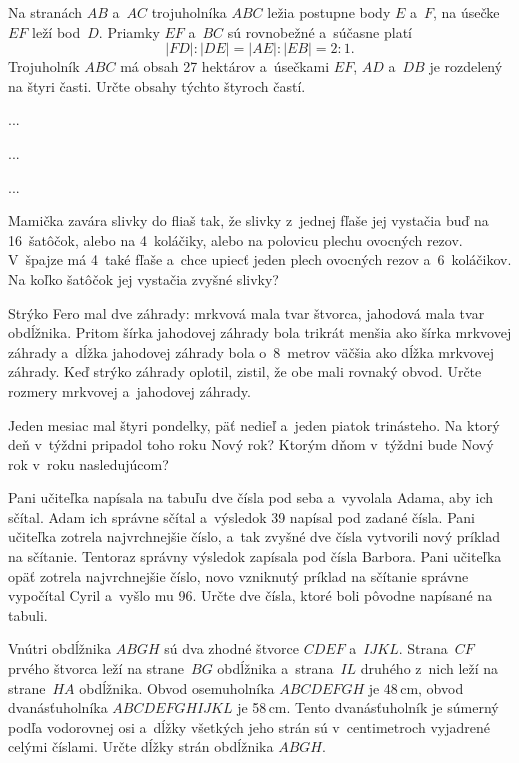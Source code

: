 {%
Na stranách $AB$ a~$AC$ trojuholníka $ABC$ ležia postupne body $E$ a~$F$,
na úsečke~$EF$ leží bod~$D$.
Priamky $EF$ a~$BC$ sú rovnobežné a~súčasne platí
$$
|FD|:|DE|=|AE|:|EB|= 2:1.
$$
Trojuholník $ABC$ má obsah 27 hektárov a~úsečkami $EF$, $AD$ a~$DB$ je rozdelený na štyri časti.
Určte obsahy týchto štyroch častí.
}

{%
...}

{%
...}

{%
...}

{%
Mamička zavára slivky do fliaš tak, že slivky z~jednej fľaše jej vystačia buď na 16~šatôčok, alebo na 4~koláčiky, alebo na polovicu plechu ovocných rezov.
V~špajze má 4~také fľaše a~chce upiecť jeden plech ovocných rezov a~6~koláčikov.
Na koľko šatôčok jej vystačia zvyšné slivky?}

{%
Strýko Fero mal dve záhrady: mrkvová mala tvar štvorca, jahodová mala tvar obdĺžnika.
Pritom šírka jahodovej záhrady bola trikrát menšia ako šírka mrkvovej záhrady a~dĺžka jahodovej záhrady bola o~8~metrov väčšia ako dĺžka mrkvovej záhrady. Keď strýko záhrady oplotil, zistil, že obe mali rovnaký obvod. Určte rozmery mrkvovej a~jahodovej záhrady.}

{%
Jeden mesiac mal štyri pondelky, päť nedieľ a~jeden piatok trinásteho. Na ktorý deň v~týždni pripadol toho roku Nový rok?
Ktorým dňom v~týždni bude Nový rok v~roku nasledujúcom?}

{%
Pani učiteľka napísala na tabuľu dve čísla pod seba a~vyvolala Adama, aby ich sčítal.
Adam ich správne sčítal a~výsledok 39 napísal pod zadané čísla.
Pani učiteľka zotrela najvrchnejšie číslo, a~tak zvyšné dve čísla vytvorili nový príklad na sčítanie.
Tentoraz správny výsledok zapísala pod čísla Barbora.
Pani učiteľka opäť zotrela najvrchnejšie číslo, novo vzniknutý príklad na sčítanie správne vypočítal Cyril a~vyšlo mu 96.
Určte dve čísla, ktoré boli pôvodne napísané na tabuli.
}

{%
Vnútri obdĺžnika $ABGH$ sú dva zhodné štvorce $CDEF$ a~$IJKL$.
Strana~$CF$ prvého štvorca leží na strane~$BG$ obdĺžnika a~strana~$IL$ druhého z~nich leží na strane~$HA$ obdĺžnika.
Obvod osemuholníka $ABCDEFGH$ je 48\,cm, obvod dvanásťuholníka $ABCDEFGHIJKL$ je 58\,cm.
Tento dvanásťuholník je súmerný podľa vodorovnej osi a~dĺžky všetkých jeho strán sú v~centimetroch vyjadrené celými číslami.
Určte dĺžky strán obdĺžnika $ABGH$.
\ifobrazkyvedla\else{}\fi
}


